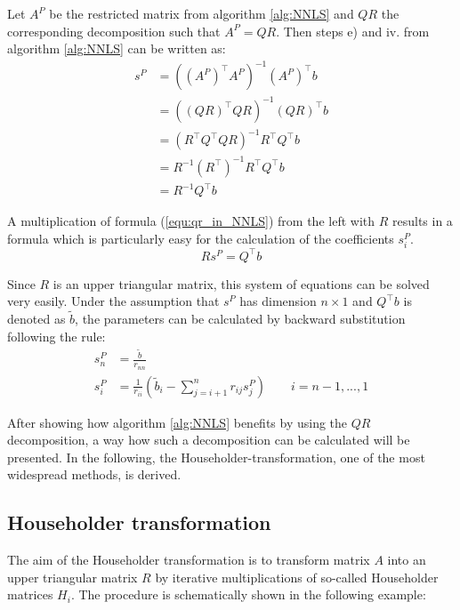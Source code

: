\begin{remark}\label{rem:qr_in_NNLS} 
	Let $A^P$ be the restricted matrix from algorithm \ref{alg:NNLS} and $QR$ the corresponding decomposition such that $A^P = QR$. Then steps e) and iv. from algorithm \ref{alg:NNLS} can be written as:
	\begin{equation}\label{equ:qr_in_NNLS}
		\begin{aligned}
			 s^P 	&= ((A^P)^\top A^P)^{-1} (A^P)^\top b \\
			 		&= ((QR)^\top QR)^{-1} (QR)^\top b \\
			 		&= (R^\top Q^\top Q R)^{-1} R^\top Q^\top b \\
			 		&= R^{-1} (R^\top)^{-1} R^\top Q^\top b \\
			 		&= R^{-1} Q^\top b
		\end{aligned}
	\end{equation}
\end{remark}

A multiplication of formula (\ref{equ:qr_in_NNLS}) from the left with $R$ results in a formula which is particularly easy for the calculation of the coefficients $s^P_i$.
\begin{equation}\label{equ:qr_in_NNLS_opt}
	R s^P = Q^\top b
\end{equation}

Since $R$ is an upper triangular matrix, this system of equations can be solved very easily. Under the assumption that $s^P$ has dimension $n \times 1$ and $Q^\top b$ is denoted as $\tilde{b}$, the parameters can be calculated by backward substitution following the rule:
\begin{align*}
	s^P_n 	&= \frac{\tilde{b}}{r_{nn}} \\
	s^P_i	&= \frac{1}{r_{ii}} \left( \tilde{b}_i - \sum_{j = i + 1}^{n} r_{ij} s^P_j\right) \quad \quad i = n-1, ..., 1
\end{align*}

After showing how algorithm \ref{alg:NNLS} benefits by using the $QR$ decomposition, a way how such a decomposition can be calculated will be presented. In the following, the Householder-transformation, one of the most widespread methods, is derived.

\subsection{Householder transformation}  

The aim of the Householder transformation is to transform matrix $A$ into an upper triangular matrix $R$ by iterative multiplications of so-called Householder matrices $H_i$. 
The procedure is schematically shown in the following example: 

